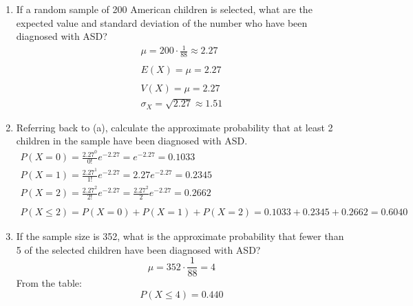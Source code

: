 \documentclass[letterpaper,12pt,fleqn]{article}
\renewcommand{\o}{\sigma}
\begin{document}
\begin{enumerate}[label={\alph*)}]
\item If a random sample of 200 American children is selected, what are the expected value and standard deviation of the
  number who have been diagnosed with ASD?
  \begin{gather*}
    \mu=200\cdot\frac{1}{88}\approx2.27 \\
    \\
    E(X)=\mu=2.27 \\
    \\
    V(X)=\mu=2.27 \\
    \o_X=\sqrt{2.27}\approx1.51
  \end{gather*}
\item Referring back to (a), calculate the approximate probability that at least 2 children in the sample have been
  diagnosed with ASD.
  \begin{gather*}
    P(X=0)=\frac{2.27^0}{0!}e^{-2.27}=e^{-2.27}=0.1033 \\
    P(X=1)=\frac{2.27^1}{1!}e^{-2.27}=2.27e^{-2.27}=0.2345 \\
    P(X=2)=\frac{2.27^2}{2!}e^{-2.27}=\frac{2.27^2}{2}e^{-2.27}=0.2662 \\
    \\
    P(X\le2)=P(X=0)+P(X=1)+P(X=2)=0.1033+0.2345+0.2662=0.6040
  \end{gather*}
\item If the sample size is 352, what is the approximate probability that fewer than 5 of the selected children have been
  diagnosed with ASD?
  \[\mu=352\cdot\frac{1}{88}=4\]
  From the table:
  \[P(X\le4)=0.440\]
\end{enumerate}
\end{document}
